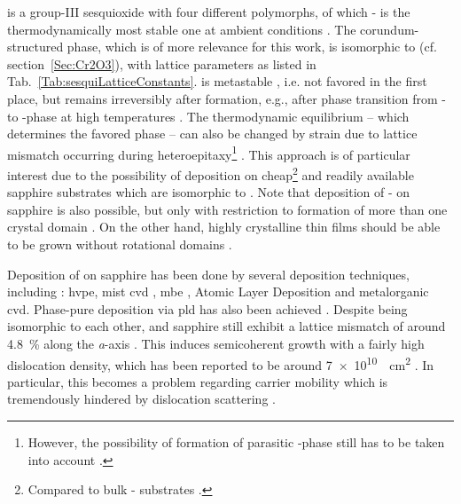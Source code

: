  is a group-III sesquioxide with four different polymorphs, of which \textbeta- is the thermodynamically most stable one at ambient conditions
    \cite{schewski2015,hassa2021a,petersen2023}.
The corundum-structured \agao{} phase, which is of more relevance for this work, is isomorphic to  (cf. section~\ref{Sec:Cr2O3}), with lattice parameters as listed in Tab.~\ref{Tab:sesquiLatticeConstants}.
\agao{} is metastable
    \cite{kaneko2023},
i.e. not favored in the first place, but remains irreversibly after formation, e.g., after phase transition from \textbeta- to \textalpha-phase at high temperatures
    \cite{pearton2018}.
The thermodynamic equilibrium -- which determines the favored phase -- can also be changed by strain due to lattice mismatch occurring during heteroepitaxy\footnote{
    However, the possibility of formation of parasitic \textbeta-phase still has to be taken into account
        \cite{petersen2023}.
    }
    \cite{schewski2015}.
This approach is of particular interest due to the possibility of deposition on cheap\footnote{
    Compared to bulk \textbeta- substrates
        \cite{yang2022,kaneko2023}.
}
and readily available sapphire substrates which are isomorphic to \agao{}
    \cite{pearton2018,polyakov2022,kaneko2023}.
Note that deposition of \textbeta- on sapphire is also possible, but only with restriction to formation of more than one crystal domain
    \cite{yang2022}.
On the other hand, highly crystalline
    \cite{pearton2018}
\agao{} thin films should be able to be grown without rotational domains
    \cite{yang2022}.

Deposition of \agao{} on sapphire has been done by several deposition techniques, including \cite{yang2022}:
    \gls{hvpe},
    mist \gls{cvd}
        \cite{kaneko2012},
    \gls{mbe}
        \cite{schewski2015},
    Atomic Layer Deposition and
    metalorganic \gls{cvd}.
Phase-pure deposition via \gls{pld} has also been achieved
    \cite{schewski2015,petersen2023}.
Despite being isomorphic to each other, \agao{} and sapphire still exhibit a lattice mismatch of around \qty{4.8}{\percent} along the \textit{a}-axis
    \cite{kaneko2023}.
This induces semicoherent growth with a fairly high dislocation density, which has been reported to be around \qty{7e10}{\per\square\cm}
    \cite{kaneko2012}.
In particular, this becomes a problem regarding carrier mobility which is tremendously hindered by dislocation scattering
    \cite{kaneko2023}.

